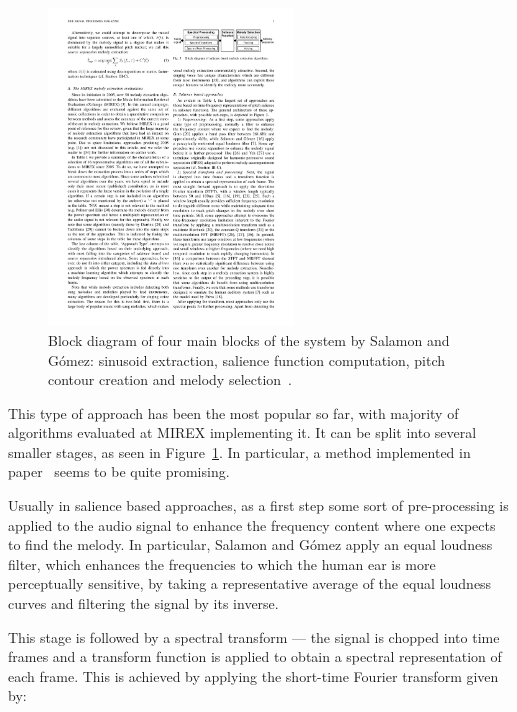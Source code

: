 \begin{figure}
  \vspace{-30pt}
  \begin{center}
    \includegraphics[width=0.58\textwidth]{Figures/salienceoveralldiagram}
  \end{center}
  \caption{Block diagram of four main blocks of the system by Salamon and G\'{o}mez: sinusoid extraction, salience function computation, pitch contour creation and melody selection~\cite{comparison}.}
  \label{fig:3stepsalience}
\end{figure}

This type of approach has been the most popular so far, with majority of algorithms evaluated at MIREX implementing it. It can be split into several smaller stages, as seen in Figure~\ref{fig:3stepsalience}. In particular, a method implemented in paper~\cite{salamon} seems to be quite promising.

Usually in salience based approaches, as a first step some sort of pre-processing is applied to the audio signal to enhance the frequency content where one expects to find the melody. In particular, Salamon and G\'{o}mez apply an equal loudness filter, which enhances the frequencies to which the human ear is more perceptually sensitive, by taking a representative average of the equal loudness curves and filtering the signal by its inverse. 

This stage is followed by a spectral transform — the signal is chopped into time frames and a transform function is applied to obtain a spectral representation of each frame.
This is achieved by applying the short-time Fourier transform given by:

